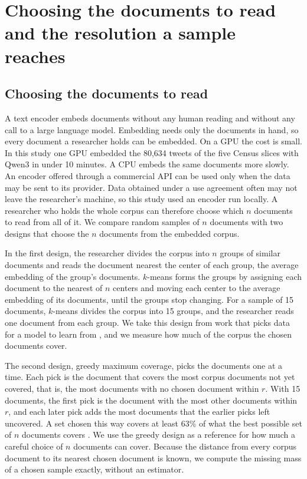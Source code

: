 \section{Choosing the documents to read and the resolution a sample reaches}

\subsection{Choosing the documents to read}
\label{sup:design}

A text encoder embeds documents without any human reading and without any call to a large language model. Embedding needs only the documents in hand, so every document a researcher holds can be embedded. On a GPU the cost is small. In this study one GPU embedded the 80{,}634 tweets of the five Census slices with Qwen3 in under 10 minutes. A CPU embeds the same documents more slowly. An encoder offered through a commercial API can be used only when the data may be sent to its provider. Data obtained under a use agreement often may not leave the researcher's machine, so this study used an encoder run locally. A researcher who holds the whole corpus can therefore choose which $n$ documents to read from all of it. We compare random samples of $n$ documents with two designs that choose the $n$ documents from the embedded corpus.

In the first design, the researcher divides the corpus into $n$ groups of similar documents and reads the document nearest the center of each group, the average embedding of the group's documents. $k$-means \citep{lloyd1982} forms the groups by assigning each document to the nearest of $n$ centers and moving each center to the average embedding of its documents, until the groups stop changing. For a sample of 15 documents, $k$-means divides the corpus into 15 groups, and the researcher reads one document from each group. We take this design from work that picks data for a model to learn from \citep{chang2021training,yuan2020coldstart,hacohen2022active,zhang2023autocot}, and we measure how much of the corpus the chosen documents cover.

The second design, greedy maximum coverage, picks the documents one at a time. Each pick is the document that covers the most corpus documents not yet covered, that is, the most documents with no chosen document within $r$. With 15 documents, the first pick is the document with the most other documents within $r$, and each later pick adds the most documents that the earlier picks left uncovered. A set chosen this way covers at least 63\% of what the best possible set of $n$ documents covers \citep{nemhauser1978}. We use the greedy design as a reference for how much a careful choice of $n$ documents can cover. Because the distance from every corpus document to its nearest chosen document is known, we compute the missing mass of a chosen sample exactly, without an estimator.

